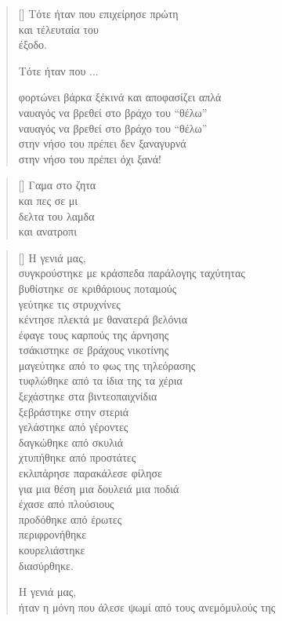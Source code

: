 \documentclass[12pt]{article}
\begin{document}
\begin{verse}[\versewidth]
  Τότε ήταν που επιχείρησε πρώτη \\
  και τέλευταία του \\
  έξοδο.

  Τότε ήταν που ...

  φορτώνει βάρκα ξέκινά και αποφασίζει απλά \\
  ναυαγός να βρεθεί στο βράχο του ``θέλω'' \\
  ναυαγός να βρεθεί στο βράχο του ``θέλω'' \\
  στην νήσο του πρέπει δεν ξαναγυρνά \\
  στην νήσο του πρέπει όχι ξανά!
\end{verse}

\newpage

\settowidth{\versewidth}{δελτα του λάμδα}
\begin{verse}[\versewidth]
  Γαμα στο ζητα \\
  και πες σε μι \\
  δελτα του λαμδα \\
  και ανατροπι
\end{verse}

\newpage

\settowidth{\versewidth}{συγκρούστηκε με κράσπεδα παράλογης}
\begin{verse}[\versewidth]
  Η γενιά μας, \\
  συγκρούστηκε με κράσπεδα παράλογης ταχύτητας \\
  βυθίστηκε σε κριθάριους ποταμούς \\
  γεύτηκε τις στρυχνίνες \\
  κέντησε πλεκτά με θανατερά βελόνια \\
  έφαγε τους καρπούς της άρνησης \\
  τσάκιστηκε σε βράχους νικοτίνης \\
  μαγεύτηκε από το φως της τηλεόρασης \\
  τυφλώθηκε από τα ίδια της τα χέρια \\
  ξεχάστηκε στα βιντεοπαιχνίδια \\
  ξεβράστηκε στην στεριά \\
  γελάστηκε από γέροντες \\
  δαγκώθηκε από σκυλιά \\
  χτυπήθηκε από προστάτες \\
  εκλιπάρησε παρακάλεσε φίλησε \\
  για μια θέση μια δουλειά μια ποδιά \\
  έχασε από πλούσιους \\
  προδόθηκε από έρωτες \\
  περιφρονήθηκε \\
  κουρελιάστηκε \\
  διασύρθηκε.

  Η γενιά μας, \\
  ήταν η μόνη που άλεσε ψωμί από τους ανεμόμυλούς της
\end{verse}
\end{document}
